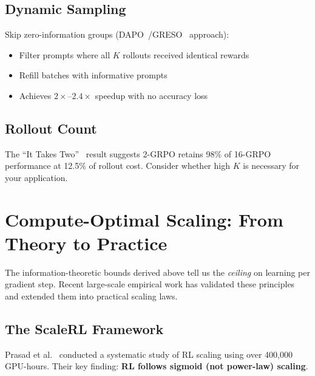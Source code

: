 \documentclass[11pt,a4paper]{article}
\theoremstyle{definition}
\theoremstyle{remark}
\begin{document}
\subsection{Dynamic Sampling}

\begin{takeaway}
Skip zero-information groups (DAPO~\cite{dapo2025}/GRESO~\cite{greso2025} approach):
\begin{itemize}
    \item Filter prompts where all $K$ rollouts received identical rewards
    \item Refill batches with informative prompts
    \item Achieves $2\times$--$2.4\times$ speedup with no accuracy loss
\end{itemize}
\end{takeaway}

\subsection{Rollout Count}

\begin{takeaway}
The ``It Takes Two''~\cite{ittakestwo2025} result suggests 2-GRPO retains 98\% of 16-GRPO performance at 12.5\% of rollout cost. Consider whether high $K$ is necessary for your application.
\end{takeaway}

\section{Compute-Optimal Scaling: From Theory to Practice}

The information-theoretic bounds derived above tell us the \emph{ceiling} on learning per gradient step. Recent large-scale empirical work has validated these principles and extended them into practical scaling laws.

\subsection{The ScaleRL Framework}

Prasad et al.~\cite{scalerl2025} conducted a systematic study of RL scaling using over 400,000 GPU-hours. Their key finding: \textbf{RL follows sigmoid (not power-law) scaling}.
\end{document}
